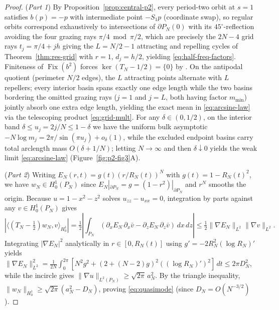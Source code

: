 \documentclass[11pt,reqno]{amsart}
\theoremstyle{definition}
\theoremstyle{remark}
\DeclareMathOperator{\Fix}{Fix}
\begin{document}
\begin{proof}
(\emph{Part 1}) By Proposition~\ref{prop:central-p2}, every period-two orbit at $s = 1$ satisfies $b(p) = -p$ with intermediate point $-S_1 p$ (coordinate swap), so regular orbits correspond exhaustively to intersections of $\partial P_N(0)$ with its $45^\circ$-reflection avoiding the four grazing rays $\pi/4 \bmod \pi/2$, which are precisely the $2N - 4$ grid rays $t_j = \pi/4 + jh$ giving the $L = N/2 - 1$ attracting and repelling cycles of Theorem~\ref{thm:res-grid} with $r = 1$, $d_j = h/2$, yielding \eqref{eq:half-freq-factors}. Finiteness of $\Fix(b^2)$ forces $\ker(T_N - 1/2) = \{0\}$ by \cite[Thm.~2.2]{Paper1}. On the antipodal quotient (perimeter $N/2$ edges), the $L$ attracting points alternate with $L$ repellers; every interior basin spans exactly one edge length while the two basins bordering the omitted grazing rays ($j=1$ and $j=L$, both having factor $m_{\min}$) jointly absorb one extra edge length, yielding the exact mean in \eqref{eq:arcsine-law} via the telescoping product \eqref{eq:grid-mult}. For any $\delta \in (0, 1/2)$, on the interior band $\delta \le u_j = 2j/N \le 1 - \delta$ we have the uniform bulk asymptotic $-N\log m_j = 2\pi/\sin(\pi u_j) + o_\delta(1)$, while the excluded endpoint basins carry total arclength mass $O(\delta + 1/N)$; letting $N \to \infty$ and then $\delta \downarrow 0$ yields the weak limit \eqref{eq:arcsine-law} (Figure~\ref{fig:p2-fig3}A).

(\emph{Part 2}) Writing $E_N(r,t) = g(t)(r/R_N(t))^N$ with $g(t) = 1 - R_N(t)^2$, we have $w_N \in H_0^1(P_N)$ since $E_N|_{\partial P_N} = g = (1-r^2)|_{\partial P_N}$ and $r^N$ smooths the origin. Because $u = 1 - x^2 - z^2$ solves $u_{zz} - u_{xx} = 0$, integration by parts against any $v \in H_0^1(P_N)$ gives
\[
  |\langle (T_N - \tfrac{1}{2})w_N, v \rangle_{H_0^1}| = \tfrac{1}{2}\left|\int_{P_N} (\partial_x E_N\,\partial_x \bar v - \partial_z E_N\,\partial_z \bar v)\,dx\,dz\right| \le \tfrac{1}{2}\|\nabla E_N\|_{L^2}\|\nabla v\|_{L^2}.
\]
Integrating $|\nabla E_N|^2$ analytically in $r \in [0, R_N(t)]$ using $g' = -2R_N^2(\log R_N)'$ yields $\|\nabla E_N\|_{L^2}^2 = \frac{1}{2N}\int_0^{2\pi} [N^2 g^2 + (2 + (N-2)g)^2 ((\log R_N)')^2]\,dt \le 2\pi D_N^2$, while the incircle gives $\|\nabla u\|_{L^2(P_N)} \ge \sqrt{2\pi}\,a_N^2$. By the triangle inequality, $\|w_N\|_{H_0^1} \ge \sqrt{2\pi}(a_N^2 - D_N)$, proving \eqref{eq:quasimode} (since $D_N = O(N^{-3/2})$).
\end{proof}
\end{document}
